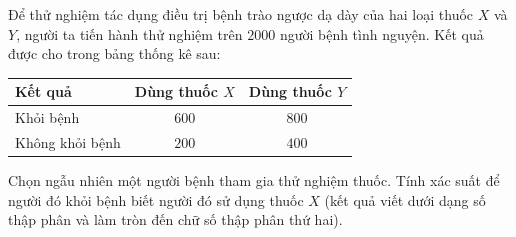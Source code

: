 \begin{ex}
Để thử nghiệm tác dụng điều trị bệnh trào ngược dạ dày của hai loại thuốc $X$ và $Y$, người ta tiến hành thử nghiệm trên $2000$ người bệnh tình nguyện. Kết quả được cho trong bảng thống kê sau:
\begin{center}
\begin{tabular}{|l|c|c|}\hline
Kết quả & Dùng thuốc $X$ & Dùng thuốc $Y$\\\hline
Khỏi bệnh & $600$ & $800$\\\hline
Không khỏi bệnh & $200$ & $400$\\\hline
\end{tabular}
\end{center}
Chọn ngẫu nhiên một người bệnh tham gia thử nghiệm thuốc. Tính xác suất để người đó khỏi bệnh biết người đó sử dụng thuốc $X$ (kết quả viết dưới dạng số thập phân và làm tròn đến chữ số thập phân thứ hai).
\end{ex}
